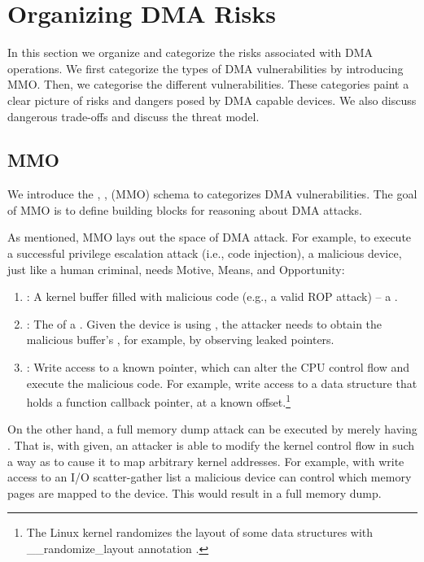
\section{Organizing DMA Risks}\label{sec:dma-risks}
In this section we organize and categorize the risks associated with DMA operations.
We first categorize the types of DMA vulnerabilities by introducing MMO. 
Then, we categorise the different \subpage{} vulnerabilities. 
These categories paint a clear picture of risks and dangers posed by DMA capable devices.
We also discuss dangerous trade-offs and discuss the threat model.

\subsection{MMO}\label{sec:mmo}

We introduce the \motivation, \means, \oportunity (MMO) schema to categorizes DMA vulnerabilities. The goal of MMO is to define building blocks for reasoning about DMA attacks.

As mentioned, MMO lays out the space of DMA attack.
For example, to execute a successful privilege escalation attack (i.e., code injection), a malicious device, just like a human criminal, needs Motive, Means, and Opportunity:
\begin{enumerate}
    \item \motivation: A kernel buffer filled with malicious code (e.g., a valid ROP attack) -- a \mabaf.
    \item \means: The \kva{} of a \mabaf. Given the device is using \iova, the attacker needs to obtain the malicious buffer's \kva{}, for example, by observing leaked pointers. 
    \item \oportunity: Write access to a known pointer, which can alter the CPU control flow and execute the malicious code. For example, write access to a data structure that holds a function callback pointer, at a known offset.\footnote{The Linux kernel randomizes the layout of some data structures with \_\_randomize\_layout annotation \cite{rand_layout}.}
\end{enumerate}

On the other hand, a full memory dump attack can be executed by merely having \oportunity.
That is, with \oportunity given, an attacker is able to modify the kernel control flow in such a way as to cause it to map arbitrary kernel addresses. For example, with write access to an I/O scatter-gather list a malicious device can control which memory pages are mapped to the device. This would result in a full memory dump.

